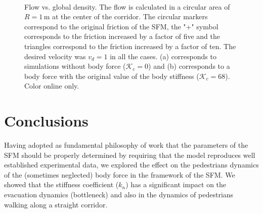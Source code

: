 \documentclass[preprint,12pt]{elsarticle}
\begin{document}
\begin{figure}[!htbp]
\centering
{}\ 
\\
\caption[width=0.47\columnwidth]{Flow vs. global density. The flow is calculated
in a circular area of $R=1\,$m at the center of the corridor. The circular 
markers correspond to the original friction of the SFM, the "+" symbol 
corresponds to the friction increased by a factor of five and the triangles 
correspond to the friction increased by a factor of ten. The desired velocity 
was $v_d=1$ in all the cases. (a) corresponds to simulations without body force 
($\mathcal{K}_c =$0) and (b) corresponds to a body force with the original value
 of the body stiffness ($\mathcal{K}_c =$68). Color online only.}
\label{flow_density}
\end{figure}



\section{\label{conclusions}Conclusions}


Having adopted as fundamental philosophy of work that the parameters of the SFM
should be properly determined by requiring that the model reproduces
well established experimental data, we explored the effect on the pedestrians
dynamics of the (sometimes neglected) body force in the framework of the SFM. We
showed that the stiffness coefficient ($k_n$) has a significant impact on the
evacuation dynamics (bottleneck) and also in the dynamics of pedestrians walking
along a straight corridor.\\
\end{document}
